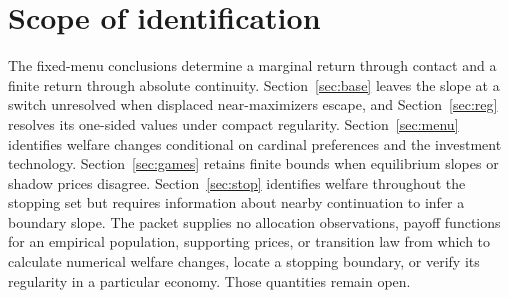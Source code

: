 \documentclass[11pt]{article}
\begin{document}
\section{Scope of identification}

The fixed-menu conclusions determine a marginal return through contact and a finite return through absolute continuity. Section~\ref{sec:base} leaves the slope at a switch unresolved when displaced near-maximizers escape, and Section~\ref{sec:reg} resolves its one-sided values under compact regularity. Section~\ref{sec:menu} identifies welfare changes conditional on cardinal preferences and the investment technology. Section~\ref{sec:games} retains finite bounds when equilibrium slopes or shadow prices disagree. Section~\ref{sec:stop} identifies welfare throughout the stopping set but requires information about nearby continuation to infer a boundary slope. The packet supplies no allocation observations, payoff functions for an empirical population, supporting prices, or transition law from which to calculate numerical welfare changes, locate a stopping boundary, or verify its regularity in a particular economy. Those quantities remain open.
\end{document}
